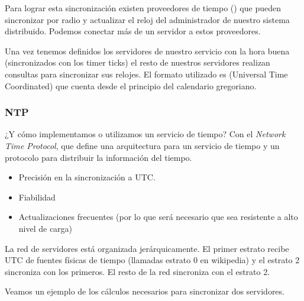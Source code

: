 Para lograr esta sincronización existen proveedores de tiempo () que pueden sincronizar por radio      y actualizar el reloj del administrador de nuestro sistema distribuido. Podemos conectar más de un servidor a estos proveedores.

Una vez tenemos definidos los servidores de nuestro servicio con la hora buena (sincronizados con los timer ticks) el resto de nuestros servidores realizan consultas para sincronizar sus relojes. El formato utilizado es  (Universal Time Coordinated) que cuenta desde el principio del calendario gregoriano.


\subsubsection{NTP}
¿Y cómo implementamos o utilizamos un servicio de tiempo? Con el  \textit{Network Time Protocol}, que define una arquitectura para un servicio de tiempo y un protocolo para distribuir la información del tiempo.

\begin{itemize}
	\item Precisión en la sincronización a UTC.
	\item Fiabilidad
	\item Actualizaciones frecuentes (por lo que será necesario que sea resistente a alto nivel de carga)
\end{itemize}

La red de servidores está organizada jerárquicamente. El primer estrato recibe UTC de fuentes  físicas de tiempo (llamadas estrato 0 en wikipedia) y el estrato 2 sincroniza con los primeros. El resto de la red sincroniza con el estrato 2.

Veamos un ejemplo de los cálculos necesarios para sincronizar dos servidores.

